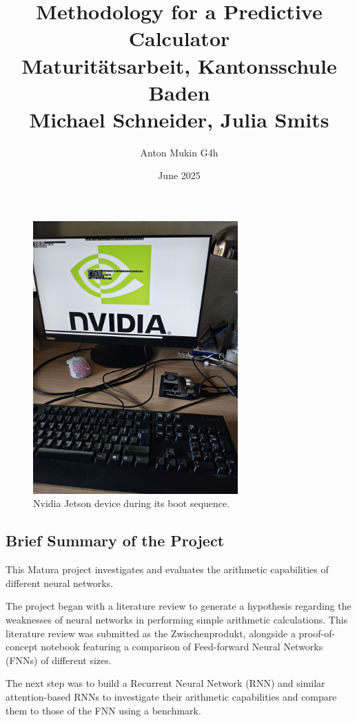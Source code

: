\documentclass{article}
\title{\huge Methodology for a Predictive Calculator\\
{\large Maturitätsarbeit, Kantonsschule Baden\\}
{\large Michael Schneider, Julia Smits}}
\author{Anton Mukin G4h}
\date{June 2025}
\begin{document}
\maketitle

\begin{figure}[htbp]
    \centering
    \includegraphics[width=0.7\textwidth]{images/JetsonBoot.jpg}
    \caption{Nvidia Jetson device during its boot sequence.}
    \label{fig:JetsonBoot}
\end{figure}

\newpage

\subsection{Brief Summary of the Project}
This Matura project investigates and evaluates the arithmetic capabilities of different neural networks.

The project began with a literature review to generate a hypothesis regarding the weaknesses of neural networks in performing simple arithmetic calculations. This literature review was submitted as the Zwischenprodukt, alongside a proof-of-concept notebook featuring a comparison of Feed-forward Neural Networks (FNNs) of different sizes.

The next step was to build a Recurrent Neural Network (RNN) and similar attention-based RNNs to investigate their arithmetic capabilities and compare them to those of the FNN using a benchmark.
\end{document}
